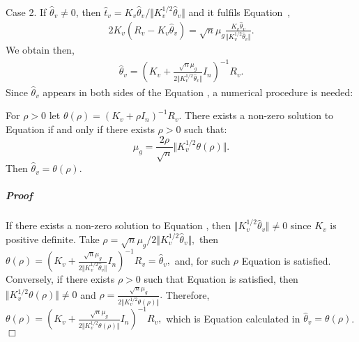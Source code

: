 Case 2. If $\widehat{\theta}_v\neq0$, then $\widehat{t}_v=K_v\widehat{\theta}_v/\Vert K_v^{1/2}\widehat{\theta}_v\Vert$ and it fulfils Equation~, 
\begin{align*}
2K_v(R_v-K_v\widehat{\theta}_v)=\sqrt{n}\mu_g\frac{K_v\widehat{\theta}_v}{\Vert K_v^{1/2}\widehat{\theta}_v\Vert}.
\end{align*}
We obtain then,
\begin{align}
\label{ttnzero}
\widehat{\theta}_v=(K_v+\frac{\sqrt{n}\mu_g}{2\Vert K_v^{1/2}\widehat{\theta}_v\Vert}I_n)^{-1}R_v.
\end{align}
Since $\widehat{\theta}_v$ appears in both sides of the Equation , a numerical procedure is needed:
\begin{prop}\label{theo:ttahat}
For $\rho>0$ let $\theta(\rho)=(K_v+\rho I_n)^{-1}R_v$. There exists a non-zero solution to Equation  if and only if there exists $\rho>0$ such that: 
\begin{equation}
\label{condttahat}
\mu_g=\frac{2\rho}{\sqrt{n}}\Vert K_v^{1/2}\theta(\rho)\Vert. 
\end{equation}
Then $\widehat{\theta}_v=\theta(\rho)$. 
\end{prop}
\subparagraph*{Proof}
If there exists a non-zero solution to Equation , then $\Vert K_v^{1/2}\widehat{\theta}_v\Vert\neq 0$ since $K_v$ is positive definite. Take $\rho={\sqrt{n}\mu_g/2\Vert K_v^{1/2}\widehat{\theta}_v\Vert},$ then 
$\theta(\rho)=(K_v+\frac{\sqrt{n}\mu_g}{2\Vert K_v^{1/2}\widehat{\theta}_v\Vert}I_n)^{-1}R_v=\widehat{\theta}_v,$
and, for such $\rho$ Equation  is satisfied. Conversely, if there exists $\rho>0$ such that Equation  is satisfied, then $\Vert K_v^{1/2}\theta(\rho)\Vert\neq 0$ and $\rho=\frac{\sqrt{n}\mu_g}{2\Vert K_v^{1/2}\theta(\rho)\Vert}.$ Therefore, 
$\theta(\rho)=(K_v+\frac{\sqrt{n}\mu_g}{2\Vert K_v^{1/2}\theta(\rho)\Vert}I_n)^{-1}R_v,$
which is Equation  calculated in $\widehat{\theta}_v=\theta(\rho)$.
\hfill $\Box$  

